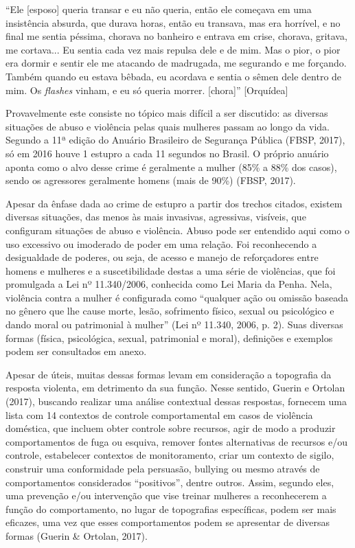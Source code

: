 ``Ele [esposo] queria transar e eu não queria, então ele começava em uma insistência absurda, que durava horas, então eu transava, mas era horrível, e no final me sentia péssima, chorava no banheiro e entrava em crise, chorava, gritava, me cortava... Eu sentia cada vez mais repulsa dele e de mim. Mas o pior, o pior era dormir e sentir ele me atacando de madrugada, me segurando e me forçando. Também quando eu estava bêbada, eu acordava e sentia o sêmen dele dentro de mim. Os \textit{flashes} vinham, e eu só queria morrer. [chora]'' [Orquídea]

Provavelmente este consiste no tópico mais difícil a ser discutido: as diversas situações de abuso e violência pelas quais mulheres passam ao longo da vida. Segundo a 11ª edição do Anuário Brasileiro de Segurança Pública (FBSP, 2017), só em 2016 houve 1 estupro a cada 11 segundos no Brasil. O próprio anuário aponta como o alvo desse crime é geralmente a mulher (85\% a 88\% dos casos), sendo os agressores geralmente homens (mais de 90\%) (FBSP, 2017).

Apesar da ênfase dada ao crime de estupro a partir dos trechos citados, existem diversas situações, das menos às mais invasivas, agressivas, visíveis, que configuram situações de abuso e violência. Abuso pode ser entendido aqui como o uso excessivo ou imoderado de poder em uma relação. Foi reconhecendo a desigualdade de poderes, ou seja, de acesso e manejo de reforçadores entre homens e mulheres e a suscetibilidade destas a uma série de violências, que foi promulgada a Lei nº 11.340/2006, conhecida como Lei Maria da Penha. Nela, violência contra a mulher é configurada como ``qualquer ação ou omissão baseada no gênero que lhe cause morte, lesão, sofrimento físico, sexual ou psicológico e dando moral ou patrimonial à mulher'' (Lei nº 11.340, 2006, p. 2). Suas diversas formas (física, psicológica, sexual, patrimonial e moral), definições e exemplos podem ser consultados em anexo.

Apesar de úteis, muitas dessas formas levam em consideração a topografia da resposta violenta, em detrimento da sua função. Nesse sentido, Guerin e Ortolan (2017), buscando realizar uma análise contextual dessas respostas, fornecem uma lista com 14 contextos de controle comportamental em casos de violência doméstica, que incluem obter controle sobre recursos, agir de modo a produzir comportamentos de fuga ou esquiva, remover fontes alternativas de recursos e/ou controle, estabelecer contextos de monitoramento, criar um contexto de sigilo, construir uma conformidade pela persuasão, bullying ou mesmo através de comportamentos considerados ``positivos'', dentre outros. Assim, segundo eles, uma prevenção e/ou intervenção que vise treinar mulheres a reconhecerem a função do comportamento, no lugar de topografias específicas, podem ser mais eficazes, uma vez que esses comportamentos podem se apresentar de diversas formas (Guerin \& Ortolan, 2017).

